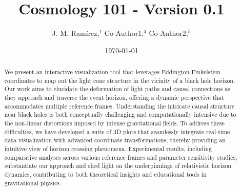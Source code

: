 \documentclass{article}
\title{Cosmology 101 - Version 0.1}
\author{J. M. Ram{\'i}rez,$^{1}$ Co-Author1,$^{4}$ Co-Author2,$^{5}$}
\date{\today}
\begin{document}
\maketitle 

 \begin{abstract}

We present an interactive visualization tool that leverages Eddington-Finkelstein coordinates to map out the light cone structure in the vicinity of a black hole horizon. Our work aims to elucidate the deformation of light paths and causal connections as they approach and traverse the event horizon, offering a dynamic perspective that accommodates multiple reference frames. Understanding the intricate causal structure near black holes is both conceptually challenging and computationally intensive due to the non-linear distortions imposed by intense gravitational fields. To address these difficulties, we have developed a suite of 3D plots that seamlessly integrate real-time data visualization with advanced coordinate transformations, thereby providing an intuitive view of horizon crossing phenomena. Experimental results, including comparative analyses across various reference frames and parameter sensitivity studies, substantiate our approach and shed light on the underpinnings of relativistic horizon dynamics, contributing to both theoretical insights and educational tools in gravitational physics.

 \end{abstract}
\end{document}
